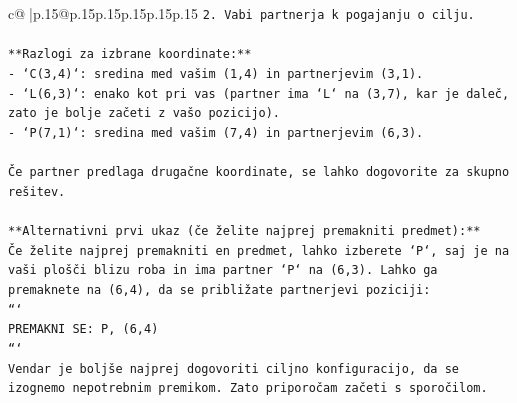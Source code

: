 \documentclass{article}
\begin{document}
{\begin{supertabular}{c@{$\;$}|p{.15\linewidth}@{}p{.15\linewidth}p{.15\linewidth}p{.15\linewidth}p{.15\linewidth}p{.15\linewidth}}
{{{\texttt{2. Vabi partnerja k pogajanju o cilju.} \\
\\ 
\texttt{**Razlogi za izbrane koordinate:**} \\
\texttt{{-} `C(3,4)`: sredina med vašim (1,4) in partnerjevim (3,1).} \\
\texttt{{-} `L(6,3)`: enako kot pri vas (partner ima `L` na (3,7), kar je daleč, zato je bolje začeti z vašo pozicijo).} \\
\texttt{{-} `P(7,1)`: sredina med vašim (7,4) in partnerjevim (6,3).} \\
\\ 
\texttt{Če partner predlaga drugačne koordinate, se lahko dogovorite za skupno rešitev.} \\
\\ 
\texttt{**Alternativni prvi ukaz (če želite najprej premakniti predmet):**} \\
\texttt{Če želite najprej premakniti en predmet, lahko izberete `P`, saj je na vaši plošči blizu roba in ima partner `P` na (6,3). Lahko ga premaknete na (6,4), da se približate partnerjevi poziciji:} \\
\texttt{```} \\
\texttt{PREMAKNI SE: P, (6,4)} \\
\texttt{```} \\
\texttt{Vendar je boljše najprej dogovoriti ciljno konfiguracijo, da se izognemo nepotrebnim premikom. Zato priporočam začeti s sporočilom.} \\
            }
        }
    }
     \\ \\


\end{supertabular}}
\end{document}
